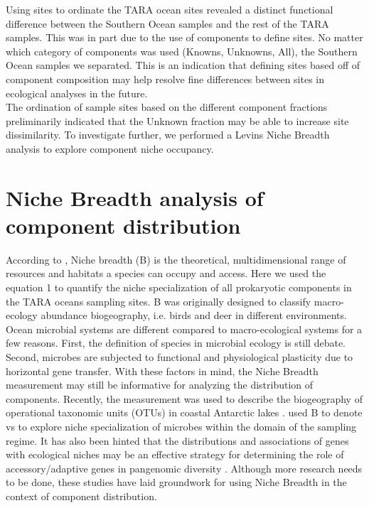 Using sites to ordinate the TARA ocean sites revealed a distinct functional difference between the Southern Ocean samples and the rest of the TARA samples. This was in part due to the use of components to define sites. No matter which category of components was used (Knowns, Unknowns, All), the Southern Ocean samples we separated. This is an indication that defining sites based off of component composition may help resolve fine differences between sites in ecological analyses in the future. \\

The ordination of sample sites based on the different component fractions preliminarily indicated that the Unknown fraction may be able to increase site dissimilarity. To investigate further, we performed a Levin\textquotesingle s Niche Breadth analysis to explore component niche occupancy.\\

\section{Niche Breadth analysis of component distribution}

According to \cite{Levins_1966}, Niche breadth (B) is the theoretical, multidimensional range of resources and habitats a species can occupy and access. Here we used the equation 1 to quantify the niche specialization of all prokaryotic components in the TARA oceans sampling sites. B was originally designed to classify macro-ecology abundance biogeography, i.e. birds and deer in different environments. Ocean microbial systems are different compared to  macro-ecological systems for a few reasons. First, the definition of species in microbial ecology is still debate. Second, microbes are subjected to functional and physiological plasticity due to horizontal gene transfer. With these factors in mind, the Niche Breadth measurement may still be informative for analyzing the distribution of components. Recently, the measurement was used to describe the biogeography of operational taxonomic units (OTUs) in coastal Antarctic lakes \citep{Logares_2012}. \cite{Logares_2012} used B to denote  vs  to explore niche specialization of microbes within the domain of the sampling regime. It has also been hinted that the distributions and associations of genes with ecological niches may be an effective strategy for determining the role of accessory/adaptive genes in pangenomic diversity \citep{Shapiro_2017}. Although more research needs to be done, these studies have laid groundwork for using Niche Breadth in the context of component distribution. \\

